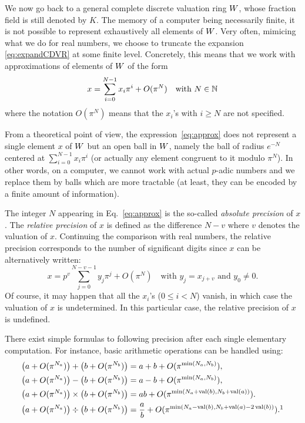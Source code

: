 \documentclass{article}
\DeclareMathOperator{\val}{val}
\begin{document}
We now go back to a general complete discrete valuation ring $W$, 
whose fraction field is still denoted by $K$.
The memory of a computer being necessarily finite, it is not possible to 
represent exhaustively all elements of $W$. Very often, mimicing 
what we do for real numbers, we choose to truncate the expansion 
\eqref{eq:expandCDVR} at some finite level. Concretely, this means 
that we work with approximations of elements of $W$ of the form
\begin{equation}
\label{eq:approx}
x = \sum_{i=0}^{N-1} x_i \pi^i + O(\pi^N) \quad \text{with } N \in \mathbb N
\end{equation}
where the notation $O(\pi^N)$ means that the $x_i$'s with $i \geq N$ are 
not specified.

\begin{rem}
\label{rem:balls}
From a theoretical point of view, the expression~\eqref{eq:approx}
does not represent a single element $x$ of $W$ but an open ball in
$W$, namely the ball of radius $e^{-N}$ centered at $\sum_{i=0}^{N-1} 
x_i \pi^i$ (or actually any element congruent to it modulo $\pi^N$).
In other words, on a computer, we cannot work with actual $p$-adic
numbers and we replace them by balls which are more tractable (at
least, they can be encoded by a finite amount of information).
\end{rem}

The integer $N$ appearing in Eq.~\eqref{eq:approx} is the so-called 
\emph{absolute precision} of $x$. The \emph{relative precision} of $x$ 
is defined as the difference $N-v$ where $v$ denotes the valuation of 
$x$. Continuing the comparison with real numbers, the relative precision 
corresponds to the number of significant digits since $x$ can be 
alternatively written:
$$x = p^v \sum_{j=0}^{N-v-1} y_j \pi^j + O(\pi^N)
\quad \text{with } y_j = x_{j+v} \text{ and } y_0 \neq 0.$$
Of course, it may happen that all the $x_i$'s ($0 \leq i < N$) vanish,
in which case the valuation of $x$ is undetermined. In this particular
case, the relative precision of $x$ is undefined.

There exist simple formulas to following precision after each single
elementary computation. For instance, basic arithmetic operations can
be handled using:
\begin{align}
\big(a + O(\pi^{N_a})\big) + \big(b + O(\pi^{N_b})\big) 
& = a + b + O(\pi^{\min(N_a,N_b)}), 
\label{eq:precadd} \\
\big(a + O(\pi^{N_a})\big) - \big(b + O(\pi^{N_b})\big) 
& = a - b + O(\pi^{\min(N_a,N_b)}), 
\label{eq:precsub} \\
\big(a + O(\pi^{N_a})\big) \times \big(b + O(\pi^{N_b})\big) 
& = ab + O(\pi^{\min(N_a + \val(b), N_b + \val(a))}).
\label{eq:precmul} \\
\big(a + O(\pi^{N_a})\big) \div \big(b + O(\pi^{N_b})\big) 
& = \frac a b + O(\pi^{\min(N_a - \val(b), N_b + \val(a) - 2 \val(b))}).\footnotemark
\label{eq:precdiv} 
\end{align}
\end{document}

